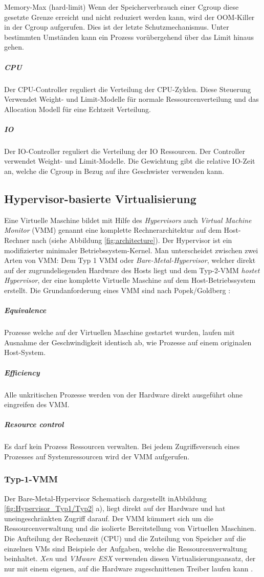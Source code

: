 Memory-Max (hard-limit)
Wenn der Speicherverbrauch einer Cgroup diese gesetzte Grenze erreicht und nicht reduziert werden kann, wird der OOM-Killer in der Cgroup aufgerufen. Dies ist der letzte Schutzmechanismus. Unter bestimmten Umständen kann ein Prozess vorübergehend über das Limit hinaus gehen.

\subparagraph{CPU}
Der CPU-Controller reguliert die Verteilung der CPU-Zyklen. Diese Steuerung Verwendet Weight- und Limit-Modelle für normale Ressourcenverteilung und das Allocation Modell für eine Echtzeit Verteilung.
\subparagraph{IO}
Der IO-Controller reguliert die Verteilung der IO Ressourcen. Der Controller verwendet Weight- und Limit-Modelle. Die Gewichtung gibt die relative IO-Zeit an, welche die Cgroup in Bezug auf ihre Geschwister verwenden kann.

\pagebreak
\subsection{Hypervisor-basierte Virtualisierung}
Eine Virtuelle Maschine bildet mit Hilfe des \emph{Hypervisors} auch \emph{Virtual Machine Monitor} (VMM) genannt eine komplette Rechnerarchitektur auf dem Host-Rechner nach (siehe Abbildung \ref{fig:architecture}). Der Hypervisor ist ein modifizierter minimaler Betriebssystem-Kernel. Man unterscheidet zwischen zwei Arten von VMM: Dem Typ 1 VMM oder \emph{Bare-Metal-Hypervisor}, welcher direkt auf der zugrundeliegenden Hardware des Hosts liegt und dem Typ-2-VMM \emph{hostet Hypervisor}, der eine komplette Virtuelle Maschine auf dem Host-Betriebssystem erstellt. Die Grundanforderung eines VMM sind nach Popek/Goldberg \cite{Popek1974FormalArchitectures,Glatz2015Betriebssysteme}:


 \subparagraph{Equivalence} 
 Prozesse welche auf der Virtuellen Maschine gestartet wurden, laufen mit Ausnahme der Geschwindigkeit identisch ab, wie Prozesse auf einem originalen Host-System.
 
\subparagraph{Efficiency} 
Alle unkritischen Prozesse werden von der Hardware direkt ausgeführt ohne eingreifen des VMM.

\subparagraph{Resource control} 
Es darf kein Prozess Ressourcen verwalten. Bei jedem Zugriffsversuch eines Prozesses auf Systemressourcen wird der VMM aufgerufen.



\subsubsection{Typ-1-VMM}
Der Bare-Metal-Hypervisor Schematisch dargestellt inAbbildung \ref{fig:Hypervisor_Typ1/Typ2} a), liegt direkt auf der Hardware und hat uneingeschränkten Zugriff darauf. Der VMM kümmert sich um die Ressourcenverwaltung und die isolierte Bereitstellung von Virtuellen Maschinen. Die Aufteilung der Rechenzeit (CPU) und die Zuteilung von Speicher auf die einzelnen VMs sind Beispiele der Aufgaben, welche die Ressourcenverwaltung beinhaltet. \emph{Xen} \cite{Install2018XenArchitecture} und \emph{VMware ESX} \cite{Go-to2018ESXi} verwenden diesen Virtualisierungsansatz, der nur mit einem eigenen, auf die Hardware zugeschnittenen Treiber laufen kann \cite{Glatz2015Betriebssysteme}.

